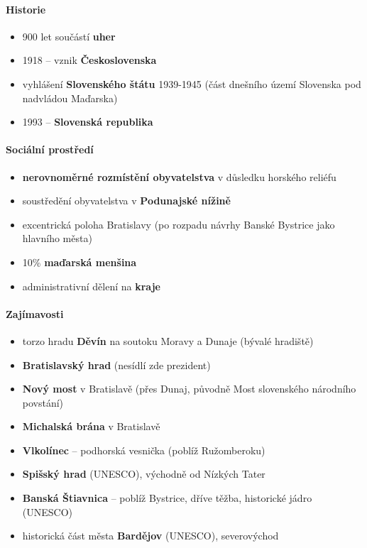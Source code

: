 \paragraph{Historie}
\begin{itemize}
\item 900 let součástí \textbf{uher}
\item 1918 -- vznik \textbf{Československa}
\item vyhlášení \textbf{Slovenského štátu} 1939-1945 (část dnešního území Slovenska pod nadvládou Maďarska)
\item 1993 -- \textbf{Slovenská republika}
\end{itemize}

\paragraph{Sociální prostředí}
\begin{itemize}
\item \textbf{nerovnoměrné rozmístění obyvatelstva} v důsledku horského reliéfu
\item soustředění obyvatelstva v \textbf{Podunajské nížině}
\item excentrická poloha Bratislavy (po rozpadu návrhy Banské Bystrice jako hlavního města)
\item 10\%\textbf{ maďarská menšina}
\item administrativní dělení na \textbf{kraje}
\end{itemize}


\paragraph{Zajímavosti}
\begin{itemize}
\item torzo hradu \textbf{Děvín} na soutoku Moravy a Dunaje (bývalé hradiště)
\item \textbf{Bratislavský hrad} (nesídlí zde prezident)
\item \textbf{Nový most} v Bratislavě (přes Dunaj, původně Most slovenského národního povstání)
\item \textbf{Michalská brána} v Bratislavě
\item \textbf{Vlkolínec} -- podhorská vesnička (poblíž Ružomberoku)
\item \textbf{Spišský hrad} (UNESCO), východně od Nízkých Tater
\item \textbf{Banská Štiavnica} -- poblíž Bystrice, dříve těžba, historické jádro (UNESCO)
\item historická část města \textbf{Bardějov} (UNESCO), severovýchod
\end{itemize}

